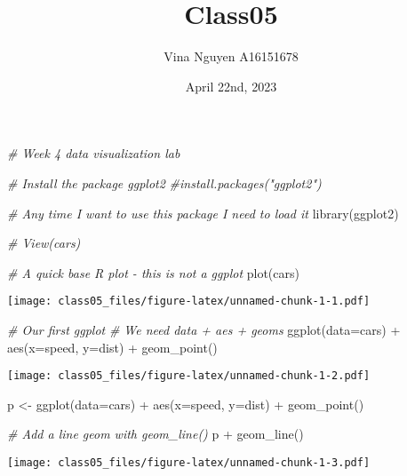 \documentclass[
]{article}
\title{Class05}
\author{Vina Nguyen A16151678}
\date{April 22nd, 2023}
\newenvironment{Shaded}{\begin{snugshade}}{\end{snugshade}}
\newcommand{\AttributeTok}[1]{\textcolor[rgb]{0.77,0.63,0.00}{#1}}
\newcommand{\CommentTok}[1]{\textcolor[rgb]{0.56,0.35,0.01}{\textit{#1}}}
\newcommand{\FunctionTok}[1]{\textcolor[rgb]{0.00,0.00,0.00}{#1}}
\newcommand{\NormalTok}[1]{#1}
\newcommand{\OtherTok}[1]{\textcolor[rgb]{0.56,0.35,0.01}{#1}}
\newcommand{\SpecialCharTok}[1]{\textcolor[rgb]{0.00,0.00,0.00}{#1}}
\begin{document}
\maketitle

\begin{Shaded}
\begin{Highlighting}[]
\CommentTok{\# Week 4 data visualization lab}

\CommentTok{\# Install the package ggplot2}
\CommentTok{\#install.packages("ggplot2")}


\CommentTok{\# Any time I want to use this package I need to load it}
\FunctionTok{library}\NormalTok{(ggplot2)}

\CommentTok{\# View(cars)}

\CommentTok{\# A quick base R plot {-} this is not a ggplot}
\FunctionTok{plot}\NormalTok{(cars)}
\end{Highlighting}
\end{Shaded}

\texttt{[image: class05\_files/figure-latex/unnamed-chunk-1-1.pdf]}

\begin{Shaded}
\begin{Highlighting}[]
\CommentTok{\# Our first ggplot}
\CommentTok{\# We need data + aes + geoms}
\FunctionTok{ggplot}\NormalTok{(}\AttributeTok{data=}\NormalTok{cars) }\SpecialCharTok{+} 
  \FunctionTok{aes}\NormalTok{(}\AttributeTok{x=}\NormalTok{speed, }\AttributeTok{y=}\NormalTok{dist) }\SpecialCharTok{+}
  \FunctionTok{geom\_point}\NormalTok{()}
\end{Highlighting}
\end{Shaded}

\texttt{[image: class05\_files/figure-latex/unnamed-chunk-1-2.pdf]}

\begin{Shaded}
\begin{Highlighting}[]
\NormalTok{p }\OtherTok{\textless{}{-}} \FunctionTok{ggplot}\NormalTok{(}\AttributeTok{data=}\NormalTok{cars) }\SpecialCharTok{+} 
  \FunctionTok{aes}\NormalTok{(}\AttributeTok{x=}\NormalTok{speed, }\AttributeTok{y=}\NormalTok{dist) }\SpecialCharTok{+}
  \FunctionTok{geom\_point}\NormalTok{()}

\CommentTok{\# Add a line geom with geom\_line()}
\NormalTok{p }\SpecialCharTok{+} \FunctionTok{geom\_line}\NormalTok{()}
\end{Highlighting}
\end{Shaded}

\texttt{[image: class05\_files/figure-latex/unnamed-chunk-1-3.pdf]}
\end{document}
